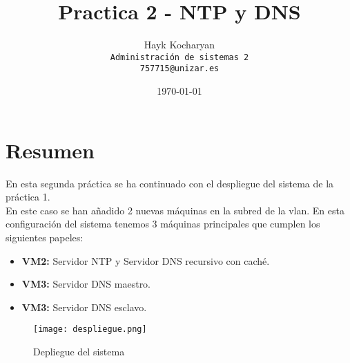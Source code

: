 \documentclass{article}
\title{Practica 2 - NTP y DNS}
\author{Hayk Kocharyan\\%
	\texttt{Administración de sistemas 2}\\%
    \texttt{757715@unizar.es}
}
\date{\today}
\begin{document}
\maketitle


\tableofcontents
\pagebreak
\section{Resumen}
En esta segunda práctica se ha continuado con el despliegue del sistema de la práctica 1.\\
En este caso se han añadido 2 nuevas máquinas en la subred de la vlan. En esta configuración del sistema tenemos 3 máquinas principales que cumplen los siguientes papeles:
\begin{itemize}
	\item \textbf{VM2: } Servidor NTP y Servidor DNS recursivo con caché.
	\item \textbf{VM3: } Servidor DNS maestro. 
	\item \textbf{VM3: } Servidor DNS esclavo. 
\end{itemize}

\begin{figure}[h!]
	\centering
		\texttt{[image: despliegue.png]}
			\caption{Depliegue del sistema}
\end{figure}
\end{document}
